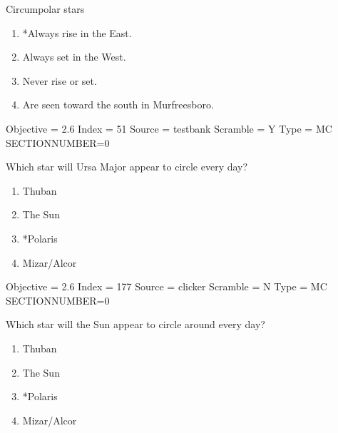 \documentclass[11pt]{article}
\begin{document}
\begin{enumerate}
\begin{minipage}{\textwidth}
\begin{minipage}{\textwidth}
\item Circumpolar stars
\begin{enumerate} 
\setlength{\itemsep}{1pt} 
\setlength{\parskip}{0pt} 
\setlength{\parsep}{0pt}
\setlength{\multicolsep}{1pt} 
\item *Always rise in the East.
\item Always set in the West.
\item Never rise or set.
\item Are seen toward the south in Murfreesboro.
\end{enumerate} 
Objective = 2.6
Index = 51
Source = testbank
Scramble = Y
Type = MC
SECTIONNUMBER=0
\end{minipage}
\end{minipage}
\vskip 0.20in

\begin{minipage}{\textwidth}
\begin{minipage}{\textwidth}
\item Which star will Ursa Major appear to circle every day?
\begin{multicols}{3}
\begin{enumerate} 
\setlength{\itemsep}{1pt} 
\setlength{\parskip}{0pt} 
\setlength{\parsep}{0pt}
\setlength{\multicolsep}{1pt} 
\item Thuban
\item The Sun
\item *Polaris
\item Mizar/Alcor
\end{enumerate} 
\vfill 
\end{multicols}

Objective = 2.6
Index = 177
Source = clicker
Scramble = N
Type = MC
SECTIONNUMBER=0
\end{minipage}
\end{minipage}
\vskip 0.20in

\begin{minipage}{\textwidth}
\begin{minipage}{\textwidth}
\item Which star will the Sun appear to circle around every day?
\begin{multicols}{3}
\begin{enumerate} 
\setlength{\itemsep}{1pt} 
\setlength{\parskip}{0pt} 
\setlength{\parsep}{0pt}
\setlength{\multicolsep}{1pt} 
\item Thuban
\item The Sun
\item *Polaris
\item Mizar/Alcor
\end{enumerate} 
\vfill 
\end{multicols}


\end{minipage}
\end{minipage}
\end{enumerate}
\end{document}
